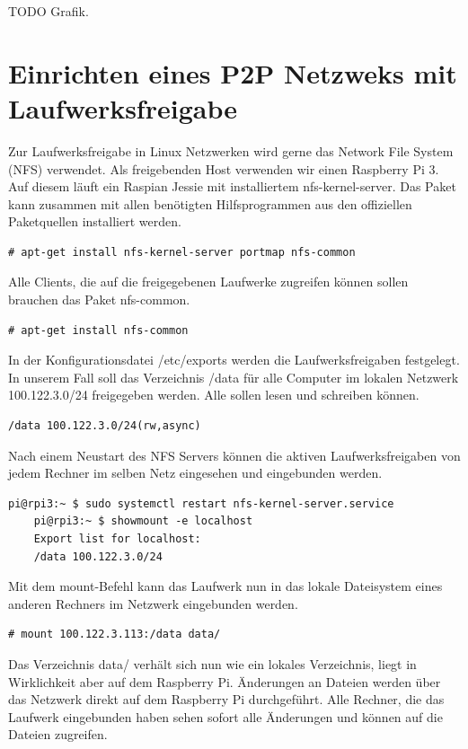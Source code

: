 \documentclass[
a4paper,     %
 headsepline, %
11pt         %
]{scrartcl}  %
\begin{document}
TODO Grafik.

\section{Einrichten eines P2P Netzweks mit Laufwerksfreigabe}
Zur Laufwerksfreigabe in Linux Netzwerken wird gerne das Network File System (NFS) verwendet. 
Als freigebenden Host verwenden wir einen Raspberry Pi 3. 
Auf diesem läuft ein Raspian Jessie mit installiertem nfs-kernel-server. 
Das Paket kann zusammen mit allen benötigten Hilfsprogrammen aus den offiziellen Paketquellen installiert werden.
\begin{lstlisting}[frame=single]
	# apt-get install nfs-kernel-server portmap nfs-common
\end{lstlisting}

Alle Clients, die auf die freigegebenen Laufwerke zugreifen können sollen brauchen das Paket nfs-common.
\begin{lstlisting}[frame=single]
	# apt-get install nfs-common
\end{lstlisting}

In der Konfigurationsdatei /etc/exports werden die Laufwerksfreigaben festgelegt. 
In unserem Fall soll das Verzeichnis /data für alle Computer im lokalen Netzwerk 100.122.3.0/24 freigegeben werden. 
Alle sollen lesen und schreiben können.
\begin{lstlisting}[frame=single]
	/data 100.122.3.0/24(rw,async)
\end{lstlisting}

Nach einem Neustart des NFS Servers können die aktiven Laufwerksfreigaben von jedem Rechner im selben Netz eingesehen und eingebunden werden.
\begin{lstlisting}[frame=single]
	pi@rpi3:~ $ sudo systemctl restart nfs-kernel-server.service
	pi@rpi3:~ $ showmount -e localhost
	Export list for localhost:
	/data 100.122.3.0/24
\end{lstlisting}

Mit dem mount-Befehl kann das Laufwerk nun in das lokale Dateisystem eines anderen Rechners im Netzwerk eingebunden werden.
\begin{lstlisting}[frame=single]
	# mount 100.122.3.113:/data data/
\end{lstlisting}
Das Verzeichnis data/ verhält sich nun wie ein lokales Verzeichnis, liegt in Wirklichkeit aber auf dem Raspberry Pi. 
Änderungen an Dateien werden über das Netzwerk direkt auf dem Raspberry Pi durchgeführt. 
Alle Rechner, die das Laufwerk eingebunden haben sehen sofort alle Änderungen und können auf die Dateien zugreifen.



% 

% 
\end{document}
